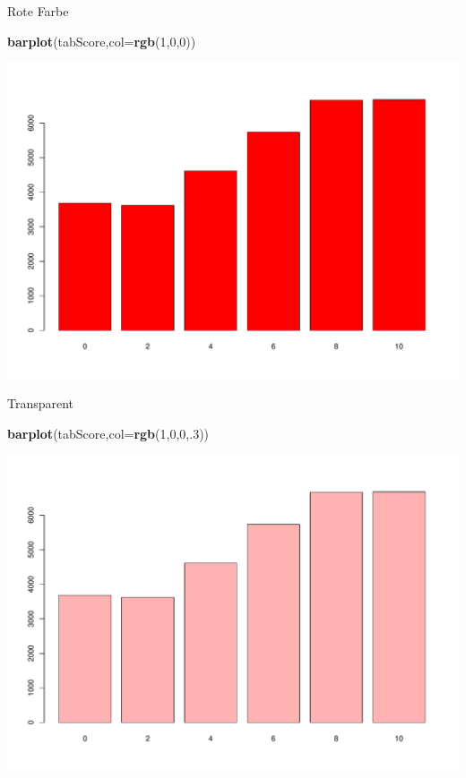 \documentclass[ignorenonframetext,]{beamer}
\newenvironment{Shaded}{}{}
\newcommand{\KeywordTok}[1]{\textcolor[rgb]{0.00,0.44,0.13}{\textbf{{#1}}}}
\newcommand{\DataTypeTok}[1]{\textcolor[rgb]{0.56,0.13,0.00}{{#1}}}
\newcommand{\DecValTok}[1]{\textcolor[rgb]{0.25,0.63,0.44}{{#1}}}
\newcommand{\NormalTok}[1]{{#1}}
\begin{document}
\begin{frame}[fragile]{Rote Farbe}

\begin{Shaded}
\begin{Highlighting}[]
\KeywordTok{barplot}\NormalTok{(tabScore,}\DataTypeTok{col=}\KeywordTok{rgb}\NormalTok{(}\DecValTok{1}\NormalTok{,}\DecValTok{0}\NormalTok{,}\DecValTok{0}\NormalTok{))}
\end{Highlighting}
\end{Shaded}

\includegraphics{R_intern_files/figure-beamer/unnamed-chunk-158-1.pdf}

\end{frame}

\begin{frame}[fragile]{Transparent}

\begin{Shaded}
\begin{Highlighting}[]
\KeywordTok{barplot}\NormalTok{(tabScore,}\DataTypeTok{col=}\KeywordTok{rgb}\NormalTok{(}\DecValTok{1}\NormalTok{,}\DecValTok{0}\NormalTok{,}\DecValTok{0}\NormalTok{,.}\DecValTok{3}\NormalTok{))}
\end{Highlighting}
\end{Shaded}

\includegraphics{R_intern_files/figure-beamer/unnamed-chunk-159-1.pdf}

\end{frame}
\end{document}
